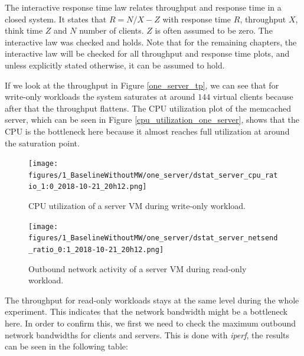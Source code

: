 The interactive response time law relates throughput and response time in a closed system. It states that $R=N/X-Z$ with response time $R$, throughput $X$, think time $Z$ and $N$ number of clients. $Z$ is often assumed to be zero. The interactive law was checked and holds. Note that for the remaining chapters, the interactive law will be checked for all throughput and response time plots, and unless explicitly stated otherwise, it can be assumed to hold. 

If we look at the throughput in Figure \ref{one_server_tp}, we can see that for write-only workloads the system saturates at around $144$ virtual clients because after that the throughput flattens. The CPU utilization plot of the memcached server, which can be seen in Figure \ref{cpu_utilization_one_server}, shows that the CPU is the bottleneck here because it almost reaches full utilization at around the saturation point. 

\begin{figure}[H]
    \begin{minipage}{0.48\textwidth}
        \centering
	    \texttt{[image: figures/1\_BaselineWithoutMW/one\_server/dstat\_server\_cpu\_ratio\_1:0\_2018-10-21\_20h12.png]}
	    \caption{CPU utilization of a server VM during write-only workload.}
	    \label{cpu_utilization_one_server}
    \end{minipage}\hfill
    \begin{minipage}{0.48\textwidth}
        \centering
	    \texttt{[image: figures/1\_BaselineWithoutMW/one\_server/dstat\_server\_netsend\_ratio\_0:1\_2018-10-21\_20h12.png]}
	    \caption{Outbound network activity of a server VM during read-only workload.}
	    \label{outbound_net_activity_one_server}
    \end{minipage}
\end{figure}

The throughput for read-only workloads stays at the same level during the whole experiment. This indicates that the network bandwidth might be a bottleneck here. In order to confirm this, we first we need to check the maximum outbound network bandwidths for clients and servers. This is done with \textit{iperf}, the results can be seen in the following table: 

